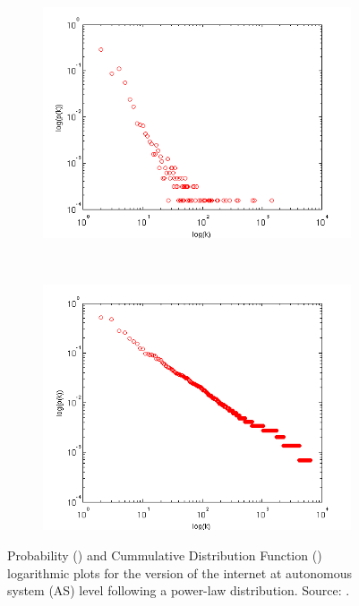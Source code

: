 \documentclass[10pt,a4paper]{article}
\begin{document}
\begin{figure}[H]
	\centering
	\begin{subfigure}[b]{0.38\textwidth}
		\includegraphics[width=\textwidth]{images/noisyplot.png}
		\caption{}
		\label{noisy}
	\end{subfigure}
	~ 
	\begin{subfigure}[b]{0.38\textwidth}
		\includegraphics[width=\textwidth]{images/cfdplot.png}
		\caption{}
		\label{cdf}
	\end{subfigure}
	\caption{ Probability () and Cummulative Distribution Function () logarithmic plots for the version of the internet at autonomous system (AS) level following a power-law distribution.  Source: \cite{frankthesis}. }
	\label{log-plots}
\end{figure}
\end{document}
